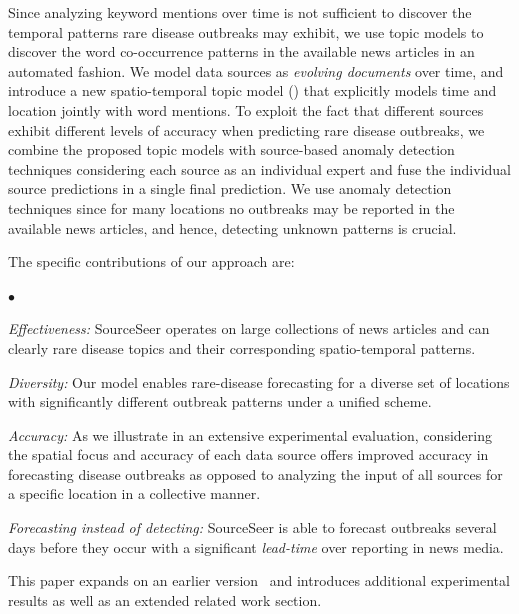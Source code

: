 \documentclass[twoside,leqno,twocolumn]{article}
\newcommand{\squishlist}{
   \begin{list}{$\bullet$}
    {
      \setlength{\itemsep}{0pt}
      \setlength{\parsep}{3pt}
      \setlength{\topsep}{3pt}
      \setlength{\partopsep}{0pt}
      \setlength{\leftmargin}{1.5em}
      \setlength{\labelwidth}{1em}
      \setlength{\labelsep}{0.5em} } }
\newcommand{\squishend}{
    \end{list}  }
\newcommand{\fullmodel}{{{\sf SourceSeer}}\xspace}
\begin{document}
Since analyzing keyword mentions over time is not sufficient to discover the temporal patterns rare disease outbreaks may exhibit, we use topic models to discover the word co-occurrence patterns in the available news articles in an automated fashion. We model data sources as {\em evolving documents} over time, and introduce a new spatio-temporal topic model () that explicitly models time and location jointly with word mentions. To exploit the fact that different sources exhibit different levels of accuracy when predicting rare disease outbreaks, we combine the proposed topic models with source-based anomaly detection techniques considering each source as an individual expert and fuse the individual source predictions in a single final prediction. We use anomaly detection techniques since for many locations no outbreaks may be reported in the available news articles, and hence, detecting unknown patterns is crucial.

The specific contributions of our approach are:
\squishlist
\item {\em Effectiveness:} \fullmodel operates on large collections of news articles and can clearly rare disease topics and their corresponding spatio-temporal patterns.
\item {\em Diversity:} Our model enables rare-disease forecasting for a diverse set of locations with significantly different outbreak patterns under a unified scheme. 
\item {\em Accuracy:} As we illustrate in an extensive experimental evaluation, considering the spatial focus and accuracy of each data source offers improved accuracy in forecasting disease outbreaks as opposed to analyzing the input of all sources for a specific location in a collective manner. 
\item{\em Forecasting instead of detecting:} \fullmodel is able to forecast outbreaks several days before they occur with a significant {\em lead-time} over reporting in news media. 
\squishend
This paper expands on an earlier version~\cite{rekatsinas:sdm15} and introduces additional experimental results as well as an extended related work section.
\end{document}

